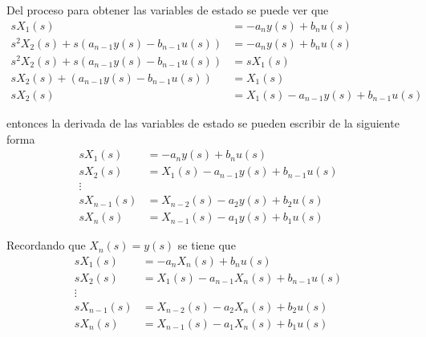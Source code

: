 Del proceso para obtener las variables de estado se puede ver que 
\[
    \begin{split}
        sX_{1}(s) & = -a_{n}y(s)+b_{n}u(s) \\
        s^{2}X_{2}(s)+s(a_{n-1}y(s)-b_{n-1}u(s)) & = -a_{n}y(s)+b_{n}u(s) \\
        s^{2}X_{2}(s)+s(a_{n-1}y(s)-b_{n-1}u(s)) & = sX_{1}(s) \\
        sX_{2}(s)+(a_{n-1}y(s)-b_{n-1}u(s)) & = X_{1}(s) \\
        sX_{2}(s) & = X_{1}(s) - a_{n-1}y(s) + b_{n-1}u(s)
    \end{split}
\]

entonces la derivada de las variables de estado se pueden escribir de la siguiente forma
\[
    \begin{split}
        sX_{1}(s) & = -a_{n}y(s) + b_{n}u(s) \\
        sX_{2}(s) & = X_{1}(s)-a_{n-1}y(s) + b_{n-1}u(s) \\
        \vdots\\
        sX_{n-1}(s) & = X_{n-2}(s)-a_{2}y(s) + b_{2}u(s) \\
        sX_{n}(s) & = X_{n-1}(s)-a_{1}y(s) + b_{1}u(s)
    \end{split}
\]

Recordando que \( X_{n}(s) = y(s) \) se tiene que 
\[
    \begin{split}
        sX_{1}(s) & = -a_{n}X_{n}(s) + b_{n}u(s) \\
        sX_{2}(s) & = X_{1}(s) - a_{n-1}X_{n}(s) + b_{n-1}u(s) \\
        \vdots \\
        sX_{n-1}(s) & = X_{n-2}(s) - a_{2}X_{n}(s) + b_{2}u(s) \\
        sX_{n}(s) & = X_{n-1}(s) - a_{1}X_{n}(s) + b_{1}u(s)
    \end{split}
\]

